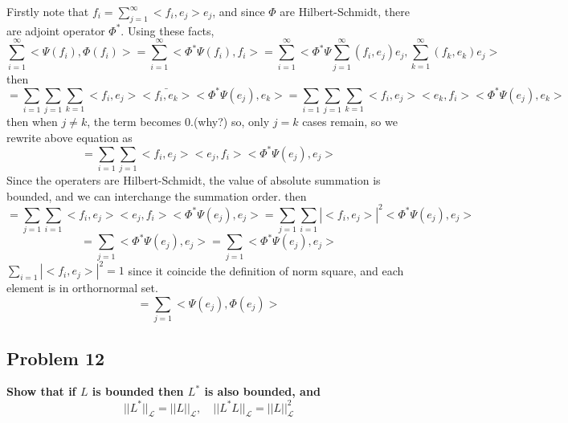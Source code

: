 \documentclass{article}
\begin{document}
Firstly note that $f_i=\sum_{j=1}^\infty<f_i,e_j>e_j$, 
and since $\Phi$ are Hilbert-Schmidt, there are adjoint operator  $\Phi^*$.
Using these facts,
\[\sum_{i=1}^{\infty} <\Psi(f_i), \Phi(f_i)>
= \sum_{i=1}^{\infty} <\Phi^*\Psi(f_i), f_i> 
= \sum_{i=1}^\infty <\Phi^*\Psi\sum_{j=1}^\infty (f_i,e_j)e_j, \sum_{k=1}^\infty (f_k,e_k)e_j>\]
then
\[=\sum _{i=1}\sum_{j=1}\sum_{k=1}<f_i,e_j>\bar{<f_i,e_k>}<\Phi^*\Psi(e_j),e_k>
=\sum _{i=1}\sum_{j=1}\sum_{k=1}<f_i,e_j><e_k,f_i><\Phi^*\Psi(e_j),e_k>\]
then when $j\neq k$, the term becomes 0.(why?)
so, only $j=k$ cases remain, so we rewrite above equation as
\[=\sum_{i=1}\sum_{j=1} <f_i,e_j><e_j,f_i><\Phi^*\Psi(e_j),e_j>\]
Since the operaters are Hilbert-Schmidt, the value of absolute summation is bounded,
and we can interchange the summation order. then
\[=\sum_{j=1}\sum_{i=1} <f_i,e_j><e_j,f_i><\Phi^*\Psi(e_j),e_j>
=\sum_{j=1}\sum_{i=1}|<f_i,e_j>|^2<\Phi^*\Psi(e_j),e_j>\]
\[=\sum_{j=1} <\Phi^*\Psi(e_j),e_j>
=\sum_{j=1} <\Phi^*\Psi(e_j),e_j>
\]
$\sum_{i=1}|<f_i,e_j>|^2 = 1$ since it coincide the definition of norm square, 
and each element is in orthornormal set.
\[=\sum_{j=1} <\Psi(e_j),\Phi(e_j)>
    \]



\subsection{Problem 12}
\textbf{
    Show that if $L$ is bounded then $L^*$ is also bounded, and
    \[||L^*||_{\mathcal{L}}=||L||_{\mathcal{L}}, \quad  
    ||L^*L||_{\mathcal{L}}=||L||^2_{\mathcal{L}}
    \]
}
\end{document}
